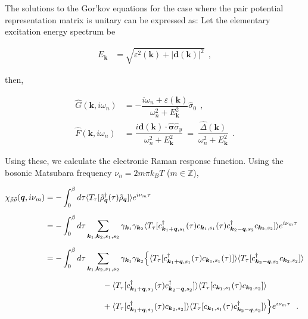 \documentclass[a4j]{jsarticle}
\begin{document}
The solutions to the Gor'kov equations for the case where the pair potential representation matrix is unitary can be expressed as:
Let the elementary excitation energy spectrum be

\begin{align}
	E_{\bm{k}}
	 & =
	\sqrt{
		\varepsilon^{2}(\bm{k}) + | \bm{d}(\bm{k}) |^{2}
	}
	\ \ ,
\end{align}

then,

\begin{align}
	\hat{G}(\bm{k} , i \omega_{n})
	 & =
	-
	\dfrac{ i \omega_{n} + \varepsilon(\bm{k}) }
	{ \omega_{n}^{2} + E_{\bm{k}}^{2} }
	\hat{\sigma}_{0}
	\ \ ,
	\\[2mm]
	\hat{F}(\bm{k},i \omega_{n})
	 & =
	\dfrac{ i \bm{d}(\bm{k}) \cdot \hat{\bm{\sigma}} \hat{\sigma}_{y} }
	{ \omega_{n}^{2} + E_{\bm{k}}^{2} }
	\ = \
	\dfrac{ \hat{\Delta}(\bm{k}) }
	{ \omega_{n}^{2} + E_{\bm{k}}^{2} }
	\ \ .
\end{align}

Using these, we calculate the electronic Raman response function.
Using the bosonic Matsubara frequency $\nu_{n}=2m\pi k_{B} T$ ($m \in \mathbb{Z}$),

\begin{align}
	\chi_{\tilde{\rho} \tilde{\rho}}(\bm{q},i \nu_{m})
	 & =
	-
	\int^{\beta}_{0} d \tau
	\langle T_{\tau}[ \tilde{\rho}_{\bm{q}}^{\dagger} (\tau) \tilde{\rho}_{\bm{q}} ] \rangle
	e^{i \nu_{m} \tau}
	\nonumber          \\[2mm]
	 & =
	-
	\int^{\beta}_{0} d \tau
	\sum_{\bm{k}_{1} , \bm{k}_{2} , s_{1} ,s_{2} }
	\gamma_{\bm{k}_{1}}
	\gamma_{\bm{k}_{2}}
	\langle T_{\tau} [
			c_{ \bm{k}_{1}+\bm{q} , s_{1} }^{\dagger} (\tau)
			c_{ \bm{k}_{1} , s_{1} } (\tau)
			c_{ \bm{k}_{2}-\bm{q} , s_{2} }^{\dagger}
			c_{ \bm{k}_{2} , s_{2} }
		] \rangle
	e^{i \nu_{m} \tau}
	\nonumber          \\[2mm]
	 & =
	-
	\int^{\beta}_{0} d \tau
	\sum_{\bm{k}_{1} , \bm{k}_{2} , s_{1} ,s_{2} }
	\gamma_{\bm{k}_{1}}
	\gamma_{\bm{k}_{2}}
	\Big\{
	\langle T_{\tau} [
			c_{ \bm{k}_{1}+\bm{q} , s_{1} }^{\dagger} (\tau)
			c_{ \bm{k}_{1} , s_{1} } (\tau)
		] \rangle
	\langle T_{\tau} [
			c_{ \bm{k}_{2}-\bm{q} , s_{2} }^{\dagger}
			c_{ \bm{k}_{2} , s_{2} }
		] \rangle
	\nonumber          \\[2mm]
	 & \hspace{25mm} -
	\langle T_{\tau} [
			c_{ \bm{k}_{1}+\bm{q} , s_{1} }^{\dagger} (\tau)
			c_{ \bm{k}_{2}-\bm{q} , s_{2} }^{\dagger}
		] \rangle
	\langle T_{\tau} [
			c_{ \bm{k}_{1} , s_{1} } (\tau)
			c_{ \bm{k}_{2} , s_{2} }
		] \rangle
	\nonumber          \\[2mm]
	 & \hspace{25mm} +
	\langle T_{\tau} [
			c_{ \bm{k}_{1}+\bm{q} , s_{1} }^{\dagger} (\tau)
			c_{ \bm{k}_{2} , s_{2} }
		] \rangle
	\langle T_{\tau} [
			c_{ \bm{k}_{1} , s_{1} } (\tau)
			c_{ \bm{k}_{2}-\bm{q} , s_{2} }^{\dagger}
		] \rangle
	\Big\}
	e^{i \nu_{m} \tau}
	\ \ .
\end{align}
\end{document}
